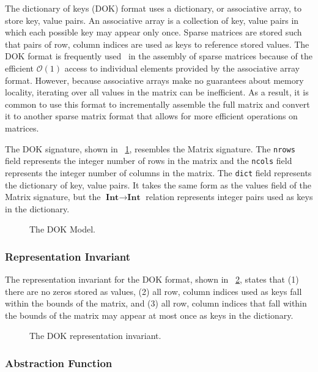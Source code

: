 \documentclass[11pt,conference]{IEEEtran}
\def\Bint{\textbf{Int}}
\begin{document}
The dictionary of keys (DOK) format uses a dictionary, or associative array, to store key, value pairs.  An associative array is a collection of key, value pairs in which each possible key may appear only once.  Sparse matrices are stored such that pairs of row, column indices are used as keys to reference stored values.  The DOK format is frequently used~\cite{scipy, eigenweb2010} in the assembly of sparse matrices because of the efficient \(\mathcal{O}(1)\) access to individual elements provided by the associative array format.  However, because associative arrays make no guarantees about memory locality, iterating over all values in the matrix can be inefficient.  As a result, it is common to use this format to incrementally assemble the full matrix and convert it to another sparse matrix format that allows for more efficient operations on matrices.

The DOK signature, shown in \figurename~\ref{model:dok}, resembles the Matrix signature.  The \texttt{nrows} field represents the integer number of rows in the matrix and the \texttt{ncols} field represents the integer number of columns in the matrix.  The \texttt{dict} field represents the dictionary of key, value pairs.  It takes the same form as the values field of the Matrix signature, but the \(\Bint \to \Bint\) relation represents integer pairs used as keys in the dictionary.

\begin{figure}
\centering

\caption{The DOK Model.}
\label{model:dok}
\end{figure}

\subsubsection{Representation Invariant}

The representation invariant for the DOK format, shown in \figurename~\ref{repinv:dok}, states that (1) there are no zeros stored as values, (2) all row, column indices used as keys fall within the bounds of the matrix, and (3) all row, column indices that fall within the bounds of the matrix may appear at most once as keys in the dictionary.

\begin{figure}
\centering

\caption{The DOK representation invariant.}
\label{repinv:dok}
\end{figure}

\subsubsection{Abstraction Function}
\end{document}

